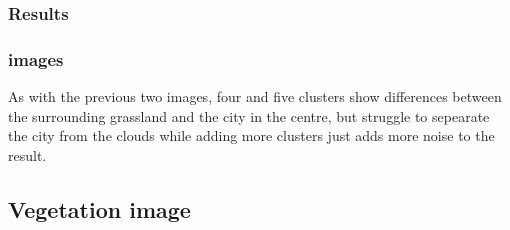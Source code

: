 \documentclass[11pt]{article}
\begin{document}
    \begin{center}
    \end{center}
    { \hspace*{\fill} \\}
    
    \begin{center}
    \end{center}
    { \hspace*{\fill} \\}
    
    \begin{center}
    \end{center}
    { \hspace*{\fill} \\}
    
    \begin{center}
    \end{center}
    { \hspace*{\fill} \\}
    
    \begin{center}
    \end{center}
    { \hspace*{\fill} \\}
    
    \subsubsection{Results}\label{results}

\subsubsection{images}\label{images}

As with the previous two images, four and five clusters show differences
between the surrounding grassland and the city in the centre, but
struggle to sepearate the city from the clouds while adding more
clusters just adds more noise to the result.

    \subsection{Vegetation image}\label{vegetation-image}
\end{document}
